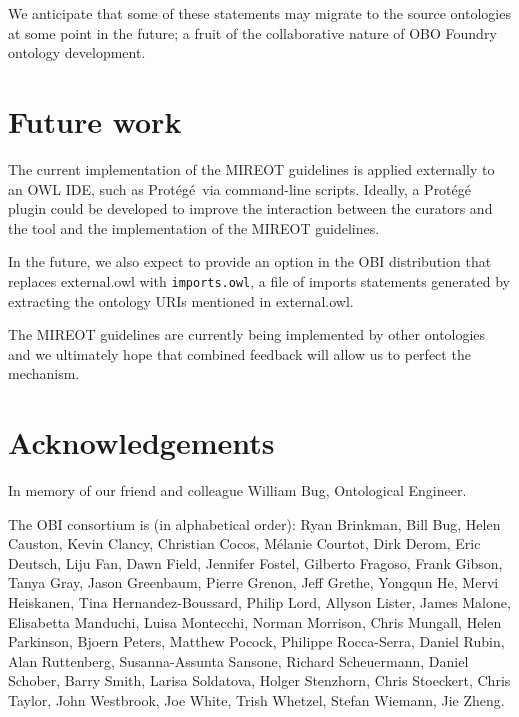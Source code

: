 \documentclass[a4paper,10pt,twocolumn]{article}
\newcommand{\protege}{Prot\'{e}g\'{e}}
\begin{document}
We anticipate that some of these statements may migrate to the source ontologies at some point in the future; a fruit of the collaborative nature of OBO Foundry ontology development. 


\section*{Future work}
The current implementation of the \ac{MIREOT} guidelines is applied externally to an OWL IDE, such as \protege\ via command-line scripts.
Ideally, a \protege\ \cite{RefWorks:1501} plugin could be developed to improve the interaction between the curators and the tool and the implementation of the MIREOT guidelines.

In the future, we also expect to provide an option in the OBI distribution that replaces \texttt{}{external.owl} with \texttt{imports.owl}, a file of imports statements generated by extracting the ontology URIs mentioned in \texttt{}{external.owl}.

The MIREOT guidelines are currently being implemented by other ontologies and we ultimately hope that combined feedback will allow us to perfect the mechanism.

\section*{Acknowledgements}

In memory of our friend and colleague William Bug, Ontological Engineer. 

The OBI consortium is (in alphabetical order): Ryan Brinkman, Bill Bug, Helen Causton, Kevin Clancy, Christian Cocos, M\'elanie Courtot, Dirk Derom, Eric Deutsch, Liju Fan, Dawn Field, Jennifer Fostel, Gilberto Fragoso, Frank Gibson, Tanya Gray, Jason Greenbaum, Pierre Grenon, Jeff Grethe, Yongqun He, Mervi Heiskanen, Tina Hernandez-Boussard, Philip Lord, Allyson Lister, James Malone, Elisabetta Manduchi, Luisa Montecchi, Norman Morrison, Chris Mungall, Helen Parkinson, Bjoern Peters, Matthew Pocock, Philippe Rocca-Serra, Daniel Rubin, Alan Ruttenberg, Susanna-Assunta Sansone, Richard Scheuermann, Daniel Schober, Barry Smith, Larisa Soldatova, Holger Stenzhorn, Chris Stoeckert, Chris Taylor, John Westbrook,  Joe White, Trish Whetzel, Stefan Wiemann, Jie Zheng. 
\end{document}
